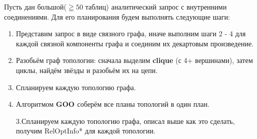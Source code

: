 \documentclass[12pt]{article}
\begin{document}
\begin{flushleft}
Пусть дан большой($\geqq 50$ таблиц) аналитический запрос с внутренними соединениями. Для его планирования будем выполнять 
следующие шаги:
\begin{enumerate}
    \item Представим запрос в виде связного графа, иначе выполним шаги 2 - 4 для каждой связной компоненты графа и соединим 
их декартовым произведение.
    \item Разобьём граф топологии: сначала выделим \textbf{clique} (с 4+ вершинами), затем циклы, найдём звёзды и разобьём их на цепи.
    \item Спланируем каждую топологию графа.
    \item Алгоритмом \textbf{GOO \cite[стр. 108]{Thomas} \cite{Allam}} соберём все планы топологий в один план.
    

    3.Спланируем каждую топологию графа, описал выше как это сделать, получим RelOptInfo* для каждой топологии.

\end{enumerate}
\centering 

\raggedright

\end{flushleft}
\end{document}
